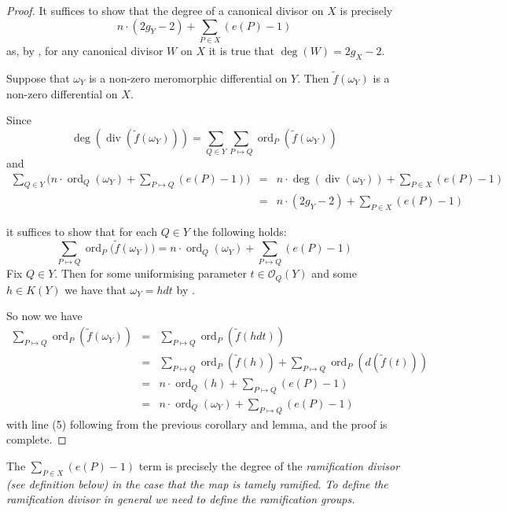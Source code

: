 \documentclass[11pt]{article} %
\DeclareMathOperator{\ord}{ord}
\DeclareMathOperator{\di}{div}
\begin{document}
\begin{proof}
	It suffices to show that the degree of a canonical divisor on $X$ is precisely 
		\begin{equation*}
			n\cdot (2g_{Y}-2)+\sum_{P\in X}(e(P)-1)
		\end{equation*}
	as, by \citep[cor, pg.209]{fulton}, for any canonical divisor $W$ on $X$ it is true that $\deg(W)=2g_X-2$.

	Suppose that $\omega_{Y}$ is a non-zero meromorphic differential on $Y$. Then $\tilde{f}(\omega_{Y})$ is 
	a non-zero differential on $X$.

	
	Since
		\begin{equation*}
			\deg(\di(\tilde{f}(\omega_{Y}))) = \sum_{Q\in Y} \sum_{P\mapsto Q} \ord_{P}(\tilde{f}(\omega_{Y}))
		\end{equation*}
	and
		\begin{eqnarray*}
			\sum_{Q\in Y} \Big(n\cdot \ord_{Q}(\omega_{Y}) +\sum_{P\mapsto Q}(e(P)-1)\Big)
			& = & n\cdot \deg(\di(\omega_{Y})) +\sum_{P\in X} (e(P)-1) \\
			& = & n\cdot (2g_{Y}-2) + \sum_{P\in X}(e(P)-1)
		\end{eqnarray*}
	
	it suffices to show that for each $Q\in Y$ the following holds:
		\begin{equation*}
			\sum_{P\mapsto Q}\ord_{P}\Big(\tilde{f}(\omega_{Y})\Big)=n\cdot \ord_{Q}(\omega_{Y})+\sum_{P\mapsto Q}(e(P)-1)
		\end{equation*}
	Fix $Q\in Y$. Then for some uniformising parameter $t\in \mathscr{O}_{Q}(Y)$ and some $h\in K(Y)$ 
	we have that $\omega_{Y}=hdt$ by \citep[prop 6, pg. 205]{fulton}.

	So now we have
		\begin{eqnarray}
			\sum_{P\mapsto Q}\ord_{P}(\tilde{f}(\omega_{Y})) & = & \sum_{P\mapsto Q}\ord_{P}(\tilde{f}(hdt)) \nonumber \\
			& = & \sum_{P\mapsto Q} \ord_{P}(\tilde{f}(h)) + \sum_{P\mapsto Q} \ord_{P}(d(\tilde{f}(t))) \nonumber \\
			& = & n\cdot \ord_{Q}(h) + \sum_{P\mapsto Q} (e(P)-1) \\
		      & = & n\cdot \ord_{Q}(\omega_{Y}) + \sum_{P\mapsto Q} (e(P)-1) \nonumber
		\end{eqnarray}
	with line (5) following from the previous corollary and lemma, and the proof is complete.
\end{proof}

The $\sum_{P\in X}(e(P)-1)$ term is precisely the degree of the \em ramification divisor \em (see definition below) in the case that the map is tamely ramified. 
To define the ramification divisor in general we need to define the ramification groups.\\
\end{document}
